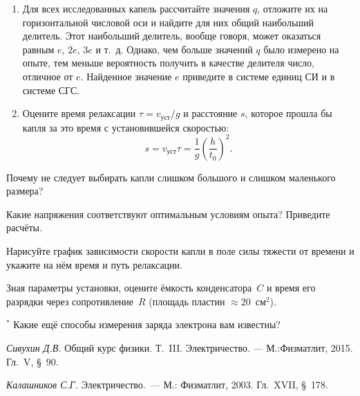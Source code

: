 \begin{lab:task}
\begin{enumerate}
\end{enumerate}


\begin{enumerate}

\item{Для всех исследованных капель рассчитайте значения $q$, отложите их на горизонтальной числовой оси и найдите для них общий наибольший делитель. Этот наибольший делитель, вообще говоря, может оказаться равным $e$, $2e$, $3e$ и т.~д. Однако, чем больше значений $q$ было измерено на опыте, тем меньше вероятность получить в качестве делителя число, отличное от $e$. Найденное значение $e$ приведите в системе единиц СИ и в системе СГС.}

\item{Оцените время релаксации $\tau=v_\text{уст}/g$ и расстояние $s$, которое прошла бы капля за это время с установившейся скоростью:
\begin{equation*}
	s=v_\text{уст}\tau=\frac{1}{g}\left(\frac{h}{t_0}\right)^2.
\end{equation*}}

\end{enumerate}

\end{lab:task}

\begin{lab:questions}

\item{Почему не следует выбирать капли слишком большого и слишком маленького размера?}

\item{Какие напряжения соответствуют оптимальным условиям опыта? Приведите расчёты.}

\item{Нарисуйте график зависимости скорости капли в поле силы тяжести от времени и укажите на нём время и путь релаксации.}

\item{Зная параметры установки, оцените ёмкость конденсатора~$C$ и время его разрядки через сопротивление~$R$ (площадь пластин ${\approx} 20$~см$^2$).}

\item{$^*$ Какие ещё способы измерения заряда электрона вам известны?}

\end{lab:questions}

\begin{lab:literature}

\item{ \emph{Сивухин Д.В.} Общий курс физики. Т.~III. Электричество. --- М.:Физматлит, 2015. Гл.~V, \S~90.}

\item{ \emph{Калашников С.Г.} Электричество.~--- М.: Физматлит, 2003. Гл.~XVII, \S~178.}

\end{lab:literature}